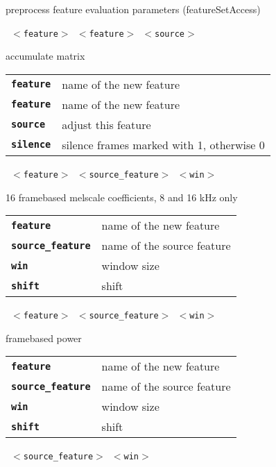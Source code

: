 \begin{description}
\begin{description}
        preprocess feature evaluation parameters (featureSetAccess)

       \texttt{ $<$feature$>$ $<$feature$>$ $<$source$>$ } \

        accumulate matrix

      \begin{tabular}{ll}
 \texttt{\textbf{feature}} &  name of the new feature \\
 \texttt{\textbf{feature}} &  name of the new feature \\
 \texttt{\textbf{source}} &   adjust this feature \\
 \texttt{\textbf{silence}} &   silence frames marked with 1, otherwise 0 \\
      \end{tabular}
       \texttt{ $<$feature$>$ $<$source\_feature$>$ $<$win$>$ } \

        16 framebased melscale coefficients, 8 and 16 kHz only

      \begin{tabular}{ll}
 \texttt{\textbf{feature}} &         name of the new feature \\
 \texttt{\textbf{source\_feature}} &  name of the source feature \\
 \texttt{\textbf{win}} &             window size  \\
 \texttt{\textbf{shift}} &            shift  \\
      \end{tabular}
       \texttt{ $<$feature$>$ $<$source\_feature$>$ $<$win$>$ } \

        framebased power

      \begin{tabular}{ll}
 \texttt{\textbf{feature}} &         name of the new feature \\
 \texttt{\textbf{source\_feature}} &  name of the source feature \\
 \texttt{\textbf{win}} &             window size  \\
 \texttt{\textbf{shift}} &            shift  \\
      \end{tabular}
       \texttt{ $<$source\_feature$>$ $<$win$>$         } \


\end{description}
\end{description}
